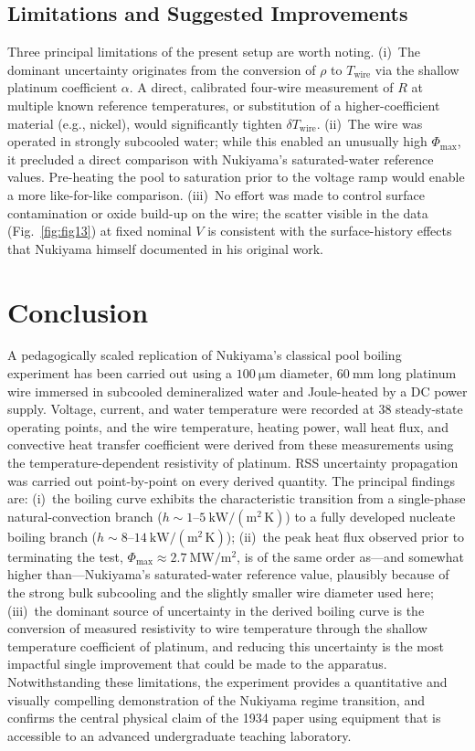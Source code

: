 \documentclass[conference]{IEEEtran}
\begin{document}
\subsection{Limitations and Suggested Improvements}
Three principal limitations of the present setup are worth noting. (i)~The dominant uncertainty originates from the conversion of $\rho$ to $T_{\mathrm{wire}}$ via the shallow platinum coefficient $\alpha$. A direct, calibrated four-wire measurement of $R$ at multiple known reference temperatures, or substitution of a higher-coefficient material (e.g., nickel), would significantly tighten $\delta T_{\mathrm{wire}}$. (ii)~The wire was operated in strongly subcooled water; while this enabled an unusually high $\Phi_{\max}$, it precluded a direct comparison with Nukiyama's saturated-water reference values. Pre-heating the pool to saturation prior to the voltage ramp would enable a more like-for-like comparison. (iii)~No effort was made to control surface contamination or oxide build-up on the wire; the scatter visible in the data (Fig.~\ref{fig:fig13}) at fixed nominal $V$ is consistent with the surface-history effects that Nukiyama himself documented in his original work.

\section{Conclusion}
A pedagogically scaled replication of Nukiyama's classical pool boiling experiment has been carried out using a $100~\mathrm{\mu m}$ diameter, $60~\mathrm{mm}$ long platinum wire immersed in subcooled demineralized water and Joule-heated by a DC power supply. Voltage, current, and water temperature were recorded at 38 steady-state operating points, and the wire temperature, heating power, wall heat flux, and convective heat transfer coefficient were derived from these measurements using the temperature-dependent resistivity of platinum. RSS uncertainty propagation was carried out point-by-point on every derived quantity. The principal findings are: (i)~the boiling curve exhibits the characteristic transition from a single-phase natural-convection branch ($h\sim 1$--$5~\mathrm{kW/(m^2\,K)}$) to a fully developed nucleate boiling branch ($h\sim 8$--$14~\mathrm{kW/(m^2\,K)}$); (ii)~the peak heat flux observed prior to terminating the test, $\Phi_{\max}\approx 2.7~\mathrm{MW/m^2}$, is of the same order as---and somewhat higher than---Nukiyama's saturated-water reference value, plausibly because of the strong bulk subcooling and the slightly smaller wire diameter used here; (iii)~the dominant source of uncertainty in the derived boiling curve is the conversion of measured resistivity to wire temperature through the shallow temperature coefficient of platinum, and reducing this uncertainty is the most impactful single improvement that could be made to the apparatus. Notwithstanding these limitations, the experiment provides a quantitative and visually compelling demonstration of the Nukiyama regime transition, and confirms the central physical claim of the 1934 paper using equipment that is accessible to an advanced undergraduate teaching laboratory.
\end{document}
